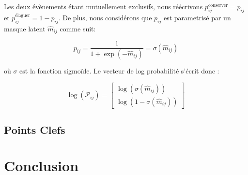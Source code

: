 \noindent Les deux évènements étant mutuellement exclusifs, nous réécrivons
$p^\text{conserver}_{ij} = p_{ij}$ et $p^\text{élaguer}_{ij} = 1 - p_{ij}$. De
plus, nous considérons que $p_{ij}$ est parametrisé par un masque latent
$\hat{m}_{ij}$ comme suit:

\begin{equation}
  \label{eqn:chap2:prob_param}
  p_{ij} = \frac{1}{1 + \exp(-\hat{m}_{ij})} = \sigma(\hat{m}_{ij})
\end{equation}

\noindent où $\sigma$ est la fonction sigmoïde. Le vecteur de log probabilité
s'écrit donc :

\begin{equation}
  \label{eqn:chap2:log_prob_param}
  \log(\mathcal{P}_{ij}) = \begin{bmatrix}
    \log(\sigma(\hat{m}_{ij})) \\
    \log(1 - \sigma(\hat{m}_{ij}))
  \end{bmatrix}
\end{equation}



\subsection*{Points Clefs}



\section*{Conclusion}